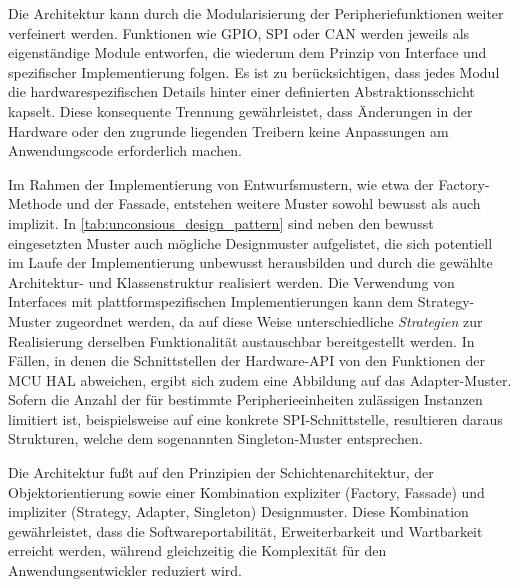 Die Architektur kann durch die Modularisierung der Peripheriefunktionen weiter verfeinert werden. 
Funktionen wie GPIO, SPI oder CAN werden jeweils als eigenständige Module entworfen, die wiederum dem Prinzip von Interface und spezifischer Implementierung folgen. 
Es ist zu berücksichtigen, dass jedes Modul die hardwarespezifischen Details hinter einer definierten Abstraktionsschicht kapselt. 
Diese konsequente Trennung gewährleistet, dass Änderungen in der Hardware oder den zugrunde liegenden Treibern keine Anpassungen am Anwendungscode erforderlich machen.

Im Rahmen der Implementierung von Entwurfsmustern, wie etwa der Factory-Methode und der Fassade, entstehen weitere Muster sowohl bewusst als auch implizit. In \cref{tab:unconsious_design_pattern} sind neben den bewusst eingesetzten Muster auch mögliche Designmuster aufgelistet, die sich potentiell im Laufe der Implementierung unbewusst herausbilden und durch die gewählte Architektur- und Klassenstruktur realisiert werden.
Die Verwendung von Interfaces mit plattformspezifischen Implementierungen kann dem Strategy-Muster zugeordnet werden, da auf diese Weise unterschiedliche \textit{Strategien} zur Realisierung derselben Funktionalität austauschbar bereitgestellt werden.
In Fällen, in denen die Schnittstellen der Hardware-API von den Funktionen der MCU HAL abweichen, ergibt sich zudem eine Abbildung auf das Adapter-Muster. 
Sofern die Anzahl der für bestimmte Peripherieeinheiten zulässigen Instanzen limitiert ist, beispielsweise auf eine konkrete SPI-Schnittstelle, resultieren daraus Strukturen, welche dem sogenannten Singleton-Muster entsprechen. 

Die Architektur fußt auf den Prinzipien der Schichtenarchitektur, der Objektorientierung sowie einer Kombination expliziter (Factory, Fassade) und impliziter (Strategy, Adapter, Singleton) Designmuster. 
Diese Kombination gewährleistet, dass die Softwareportabilität, Erweiterbarkeit und Wartbarkeit erreicht werden, während gleichzeitig die Komplexität für den Anwendungsentwickler reduziert wird.

